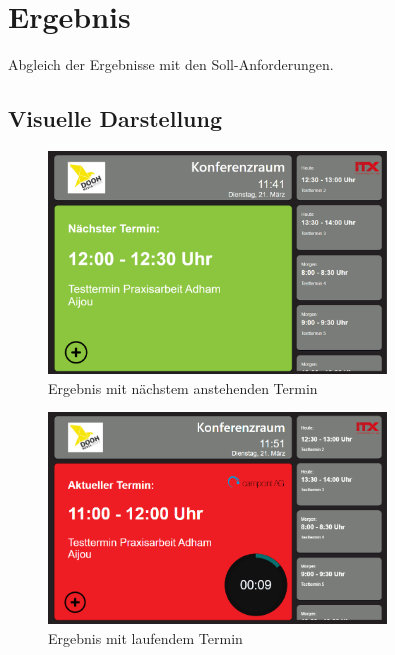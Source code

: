 
\newpage
\section{Ergebnis}\label{sec:ergebnis}
Abgleich der Ergebnisse mit den Soll-Anforderungen.
\subsection{Visuelle Darstellung}\label{subsec:visuelle-darstellung}
\par\vspace{1cm}
\begin{figure}[h]
    \centering
    \includegraphics[width=0.8\textwidth]{Bilder/Ergebnis}
    \caption{Ergebnis mit nächstem anstehenden Termin}
    \label{fig:Ergebnis mit nächstem anstehenden Termin}
\par\vspace{1cm}
\end{figure}
\justifying
\par\vspace{1cm}
\begin{figure}[h]
    \centering
    \includegraphics[width=0.8\textwidth]{Bilder/Ergebnis_LaufenderTermin}
    \caption{Ergebnis mit laufendem Termin}
    \label{fig:Ergebnis mit laufendem Termin}
\par\vspace{1cm}
\end{figure}

